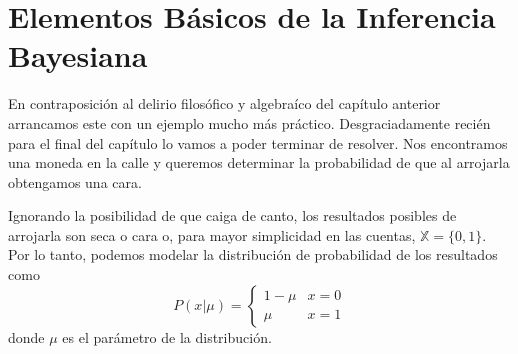 
\chapter{Elementos Básicos de la Inferencia Bayesiana}
En contraposición al delirio filosófico y algebraíco del capítulo anterior arrancamos este con un ejemplo mucho más práctico. Desgraciadamente recién para el final del capítulo lo vamos a poder terminar de resolver. Nos encontramos una moneda en la calle y queremos determinar la probabilidad de que al arrojarla obtengamos una cara.\par
Ignorando la posibilidad de que caiga de canto, los resultados posibles de arrojarla son seca o cara o, para mayor simplicidad en las cuentas, $\mathbb{X}=\{0, 1\}$. Por lo tanto, podemos modelar la distribución de probabilidad de los resultados como
\begin{equation}
    P(x|\mu)=
    \left\{
    \begin{array}{lr}
        1-\mu & x=0 \\
        \mu & x=1
    \end{array}
    \right.
    \label{2:eq:bern}
\end{equation}
donde $\mu$ es el parámetro de la distribución.

